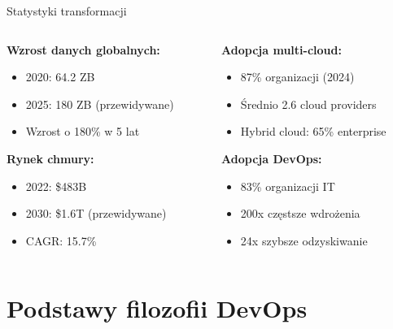 \documentclass[10pt, aspectratio=169]{beamer}
\begin{document}
\begin{frame}{Statystyki transformacji}
\begin{columns}[T]
\begin{column}{0.5\textwidth}
\textbf{Wzrost danych globalnych:}
\begin{itemize}
\item 2020: 64.2 ZB
\item 2025: 180 ZB (przewidywane)
\item Wzrost o 180\% w 5 lat
\end{itemize}

\textbf{Rynek chmury:}
\begin{itemize}
\item 2022: \$483B
\item 2030: \$1.6T (przewidywane)
\item CAGR: 15.7\%
\end{itemize}
\end{column}
\begin{column}{0.5\textwidth}
\textbf{Adopcja multi-cloud:}
\begin{itemize}
\item 87\% organizacji (2024)
\item Średnio 2.6 cloud providers
\item Hybrid cloud: 65\% enterprise
\end{itemize}

\textbf{Adopcja DevOps:}
\begin{itemize}
\item 83\% organizacji IT
\item 200x częstsze wdrożenia
\item 24x szybsze odzyskiwanie
\end{itemize}
\end{column}
\end{columns}
\end{frame}

\section{Podstawy filozofii DevOps}
\end{document}
